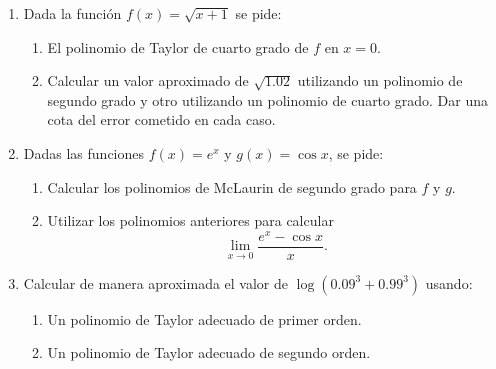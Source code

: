 \begin{enumerate}[leftmargin=*]
\item  Dada la función $f(x)=\sqrt{x+1}$ se pide:
\begin{enumerate}
\item  El polinomio de Taylor de cuarto grado de $f$ en $x=0$.

\item  Calcular un valor aproximado de $\sqrt{1.02}$ utilizando un polinomio de segundo grado y otro utilizando un
polinomio de cuarto grado. 
Dar una cota del error cometido en cada caso.
\end{enumerate}

\item Dadas las funciones
$f(x)=e^x$ y $g(x)=\cos x$, se pide:
\begin{enumerate}
\item  Calcular los polinomios de McLaurin de segundo grado para $f$ y $g$.

\item  Utilizar los polinomios anteriores para calcular \[ \lim_{x\rightarrow 0}\frac{e^x-\cos x}{x}.\]
\end{enumerate}

\item Calcular de manera aproximada el valor de $\log(0.09^3+0.99^3)$ usando:
\begin{enumerate}
\item Un polinomio de Taylor adecuado de primer orden.
\item Un polinomio de Taylor adecuado de segundo orden.
\end{enumerate}
\end{enumerate}
